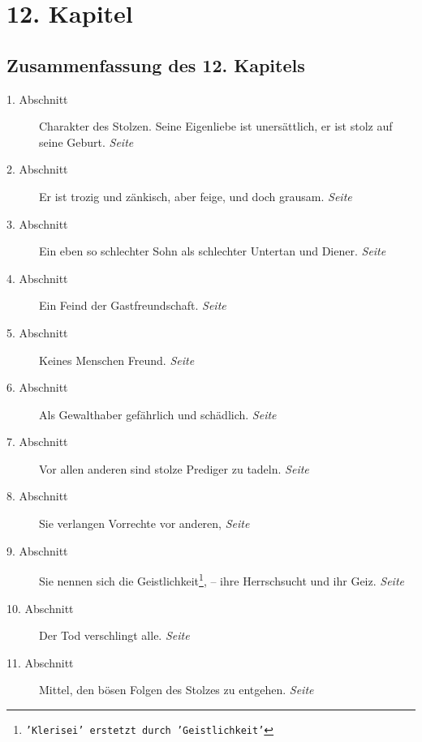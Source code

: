 
\chapter{12. Kapitel} \label{kap12}

\section{Zusammenfassung des 12. Kapitels}

\begin{description}
\item[1. Abschnitt] Charakter des Stolzen. Seine Eigenliebe ist unersättlich,
er
ist stolz auf seine Geburt.
\dotfill \textit{Seite~\pageref{kap12_ab1}}\\
\item[2. Abschnitt] Er ist trozig und zänkisch, aber feige, und doch grausam.
\dotfill \textit{Seite~\pageref{kap12_ab2}}\\
\item[3. Abschnitt] Ein eben so schlechter Sohn als schlechter Untertan und
Diener.
\dotfill \textit{Seite~\pageref{kap12_ab3}}\\
\item[4. Abschnitt] Ein Feind der Gastfreundschaft.
\dotfill \textit{Seite~\pageref{kap12_ab4}}\\
\item[5. Abschnitt] Keines Menschen Freund.
\dotfill \textit{Seite~\pageref{kap12_ab5}}\\
\item[6. Abschnitt] Als Gewalthaber gefährlich und schädlich.
\dotfill \textit{Seite~\pageref{kap12_ab6}}\\
\item[7. Abschnitt] Vor allen anderen sind stolze Prediger zu tadeln.
\dotfill \textit{Seite~\pageref{kap12_ab7}}\\
\item[8. Abschnitt] Sie verlangen Vorrechte vor anderen,
\dotfill \textit{Seite~\pageref{kap12_ab8}}\\
\item[9. Abschnitt] Sie nennen sich die Geistlichkeit\footnote{\texttt{'Klerisei' erstetzt durch 'Geistlichkeit'}}, -- ihre Herrschsucht und ihr Geiz.
\dotfill \textit{Seite~\pageref{kap12_ab9}}\\
\item[10. Abschnitt] Der Tod verschlingt alle.
\dotfill \textit{Seite~\pageref{kap12_ab10}}\\
\item[11. Abschnitt] Mittel, den bösen Folgen des Stolzes zu entgehen.
\dotfill \textit{Seite~\pageref{kap12_ab11}}\\
\end{description}

